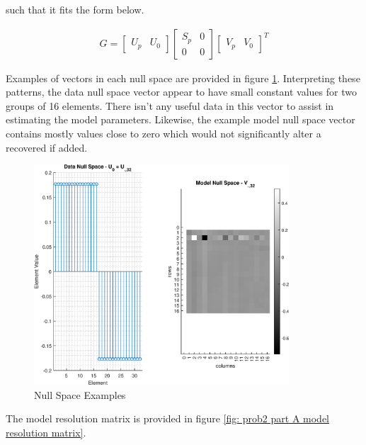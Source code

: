 such that it fits the form below.

\begin{align*}
	G = \begin{bmatrix} U_p & U_0 \end{bmatrix} \begin{bmatrix} S_p & 0 \\ 0 & 0 \end{bmatrix} \begin{bmatrix} V_p & V_0 \end{bmatrix}^T  
\end{align*}

Examples of vectors in each null space are provided in figure \ref{fig: prob2 part A null space examples}. Interpreting these patterns, the data null space vector appear to have small constant values for two groups of 16 elements. There isn't any useful data in this vector to assist in estimating the model parameters. Likewise, the example model null space vector contains mostly values close to zero which would not significantly alter a recovered if added.  

\begin{figure}[h] 
	\centering
	\includegraphics[width=0.85\textwidth]{./images/prob2_partA_null_space_examples.eps}
	\caption{Null Space Examples}
	\label{fig: prob2 part A null space examples}
\end{figure}
\FloatBarrier

The model resolution matrix is provided in figure \ref{fig: prob2 part A model resolution matrix}. 
 
